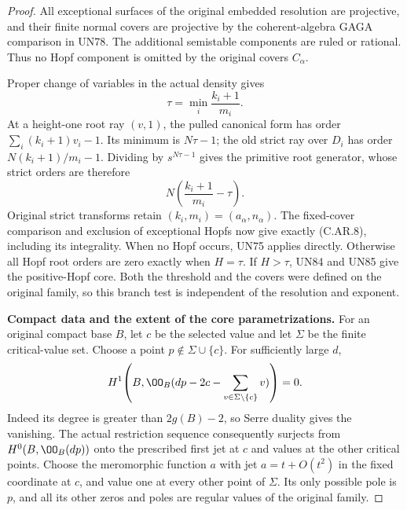 \begin{proof}
All exceptional surfaces of the original
embedded resolution are projective, and
their finite normal covers are projective
by the coherent-algebra GAGA comparison
in UN78. The additional semistable
components are ruled or rational.
Thus no Hopf component is omitted by
the original covers \(C_\alpha\).

Proper change of variables in the actual
density gives
\[
                   \tau=\min_i\frac{k_i+1}{m_i}.
 \tag{C.AR.15}
\]
At a height-one root ray \((v,1)\),
the pulled canonical form has order
\(\sum_i(k_i+1)v_i-1\). Its minimum
is \(N\tau-1\); the old strict ray
over \(D_i\) has order
\(N(k_i+1)/m_i-1\). Dividing by
\(s^{N\tau-1}\) gives the primitive
root generator, whose strict orders
are therefore
\[
                  N\left(\frac{k_i+1}{m_i}-\tau\right).
 \tag{C.AR.16}
\]
Original strict transforms retain
\((k_i,m_i)=(a_\alpha,n_\alpha)\).
The fixed-cover comparison and exclusion
of exceptional Hopfs now give exactly
(C.AR.8), including its integrality.
When no Hopf occurs, UN75 applies
directly. Otherwise all Hopf root
orders are zero exactly when
\(H=\tau\). If \(H>\tau\), UN84
and UN85 give the positive-Hopf core.
Both the threshold and the covers
were defined on the original family,
so this branch test is independent
of the resolution and exponent.

\par\medskip\noindent\textbf{Compact data and the extent of the core parametrizations.}
For an original compact base \(B\), let
\(c\) be the selected value and let
\(\Sigma\) be the finite critical-value set.
Choose a point \(p\notin\Sigma\cup\{c\}\).
For sufficiently large \(d\),
\[
 H^1\!\left(B,\OO_B(dp-2c-
                    \sum_{v\in\Sigma\setminus\{c\}}v)\right)=0.
\]
Indeed its degree is greater than \(2g(B)-2\),
so Serre duality gives the vanishing. The
actual restriction sequence consequently
surjects from \(H^0(B,\OO_B(dp))\) onto
the prescribed first jet at \(c\) and
values at the other critical points.
Choose the meromorphic function \(a\)
with jet \(a=t+O(t^2)\) in the fixed
coordinate at \(c\), and value one at
every other point of \(\Sigma\).
Its only possible pole is \(p\), and
all its other zeros and poles are regular
values of the original family.


\end{proof}
